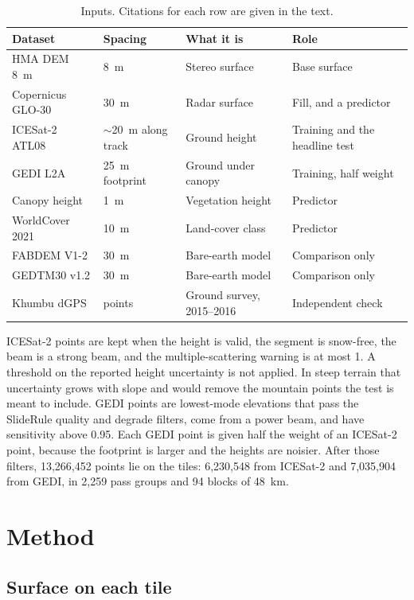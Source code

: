 \documentclass[11pt]{article}
\begin{document}
\begin{table}[ht]
  \centering
  \caption{Inputs. Citations for each row are given in the text.}
  \label{tab:data}
  \small
  \begin{tabular}{@{}lllp{4.8cm}@{}}
    \toprule
    Dataset & Spacing & What it is & Role \\
    \midrule
    HMA DEM 8~m & 8~m & Stereo surface & Base surface \\
    Copernicus GLO-30 & 30~m & Radar surface & Fill, and a predictor \\
    ICESat-2 ATL08 & $\sim$20~m along track & Ground height & Training and the headline test \\
    GEDI L2A & 25~m footprint & Ground under canopy & Training, half weight \\
    Canopy height & 1~m & Vegetation height & Predictor \\
    WorldCover 2021 & 10~m & Land-cover class & Predictor \\
    FABDEM V1-2 & 30~m & Bare-earth model & Comparison only \\
    GEDTM30 v1.2 & 30~m & Bare-earth model & Comparison only \\
    Khumbu dGPS & points & Ground survey, 2015--2016 & Independent check \\
    \bottomrule
  \end{tabular}
\end{table}

ICESat-2 points are kept when the height is valid, the segment is snow-free, the beam is a strong beam, and the multiple-scattering warning is at most 1.
A threshold on the reported height uncertainty is not applied.
In steep terrain that uncertainty grows with slope and would remove the mountain points the test is meant to include.
GEDI points are lowest-mode elevations that pass the SlideRule quality and degrade filters, come from a power beam, and have sensitivity above 0.95.
Each GEDI point is given half the weight of an ICESat-2 point, because the footprint is larger and the heights are noisier.
After those filters, 13,266,452 points lie on the tiles: 6,230,548 from ICESat-2 and 7,035,904 from GEDI, in 2,259 pass groups and 94 blocks of 48~km.

\section{Method}

\subsection{Surface on each tile}
\end{document}
